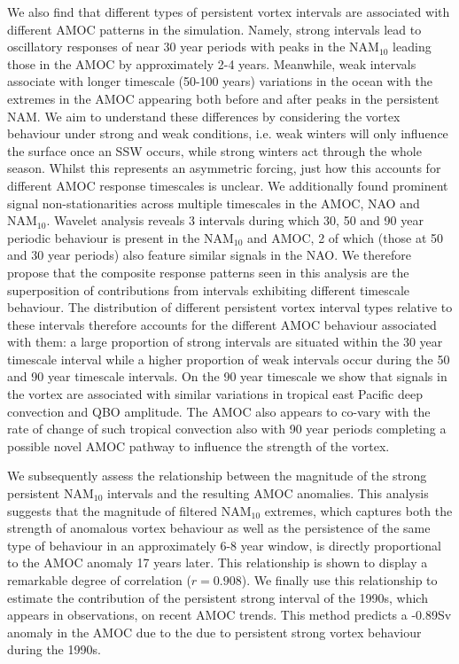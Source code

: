 We also find that different types of persistent vortex intervals are associated with different AMOC patterns in the simulation. Namely, strong intervals lead to oscillatory responses of near 30 year periods with peaks in the NAM$_{10}$ leading those in the AMOC by approximately 2-4 years. Meanwhile, weak intervals associate with longer timescale (50-100 years) variations in the ocean with the extremes in the AMOC appearing both before and after peaks in the persistent NAM. We aim to understand these differences by considering the vortex behaviour under strong and weak conditions, i.e. weak winters will only influence the surface once an SSW occurs, while strong winters act through the whole season. Whilst this represents an asymmetric forcing, just how this accounts for different AMOC response timescales is unclear. We additionally found prominent signal non-stationarities across multiple timescales in the AMOC, NAO and NAM$_{10}$. Wavelet analysis reveals 3 intervals during which 30, 50 and 90 year periodic behaviour is present in the NAM$_{10}$ and AMOC, 2 of which (those at 50 and 30 year periods) also feature similar signals in the NAO. We therefore propose that the composite response patterns seen in this analysis are the superposition of contributions from intervals exhibiting different timescale behaviour. The distribution of different persistent vortex interval types relative to these intervals therefore accounts for the different AMOC behaviour associated with them: a large proportion of strong intervals are situated within the 30 year timescale interval while a higher proportion of weak intervals occur during the 50 and 90 year timescale intervals. On the 90 year timescale we show that signals in the vortex are associated with similar variations in tropical east Pacific deep convection and QBO amplitude. The AMOC also appears to co-vary with the rate of change of such tropical convection also with 90 year periods completing a possible novel AMOC pathway to influence the strength of the vortex.

We subsequently assess the relationship between the magnitude of the strong persistent NAM$_{10}$ intervals and the resulting AMOC anomalies. This analysis suggests that the magnitude of filtered NAM$_{10}$ extremes, which captures both the strength of anomalous vortex behaviour as well as the persistence of the same type of behaviour in an approximately 6-8 year window, is directly proportional to the AMOC anomaly 17 years later. This relationship is shown to display a remarkable degree of correlation ($r = 0.908$). We finally use this relationship to estimate the contribution of the persistent strong interval of the 1990s, which appears in observations, on recent AMOC trends. This method predicts a -0.89Sv anomaly in the AMOC due to the due to persistent strong vortex behaviour during the 1990s.

